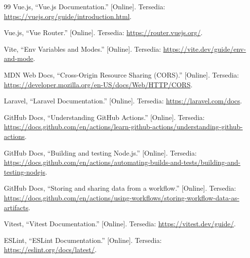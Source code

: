 \documentclass[a4paper,oneside,12pt]{report}
\renewcommand{\bibname}{Daftar Pustaka}
\begin{document}
\clearpage
{}
\renewcommand{\bibname}{Daftar Pustaka}
\begin{thebibliography}{99}
     Vue.js, ``Vue.js Documentation.'' [Online]. Tersedia: \url{https://vuejs.org/guide/introduction.html}.

     Vue.js, ``Vue Router.'' [Online]. Tersedia: \url{https://router.vuejs.org/}.

     Vite, ``Env Variables and Modes.'' [Online]. Tersedia: \url{https://vite.dev/guide/env-and-mode}.

     MDN Web Docs, ``Cross-Origin Resource Sharing (CORS).'' [Online]. Tersedia: \url{https://developer.mozilla.org/en-US/docs/Web/HTTP/CORS}.

     Laravel, ``Laravel Documentation.'' [Online]. Tersedia: \url{https://laravel.com/docs}.

     GitHub Docs, ``Understanding GitHub Actions.'' [Online]. Tersedia: \url{https://docs.github.com/en/actions/learn-github-actions/understanding-github-actions}.

     GitHub Docs, ``Building and testing Node.js.'' [Online]. Tersedia: \url{https://docs.github.com/en/actions/automating-builds-and-tests/building-and-testing-nodejs}.

     GitHub Docs, ``Storing and sharing data from a workflow.'' [Online]. Tersedia: \url{https://docs.github.com/en/actions/using-workflows/storing-workflow-data-as-artifacts}.

     Vitest, ``Vitest Documentation.'' [Online]. Tersedia: \url{https://vitest.dev/guide/}.

     ESLint, ``ESLint Documentation.'' [Online]. Tersedia: \url{https://eslint.org/docs/latest/}.

\end{thebibliography}
\end{document}
